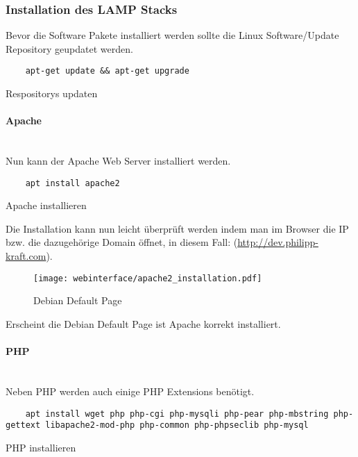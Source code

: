 \subsubsection{Installation des LAMP Stacks}
Bevor die Software Pakete installiert werden sollte die Linux Software/Update
Repository geupdatet werden.

\begin{listing}[H]
  \begin{verbatim}
    apt-get update && apt-get upgrade
  \end{verbatim}
  \caption{Respositorys updaten}
\end{listing}

\paragraph{Apache}\mbox{}\\

Nun kann der Apache Web Server installiert werden.

\begin{listing}[H]
  \begin{verbatim}
    apt install apache2
  \end{verbatim}
  \caption{Apache installieren}
\end{listing}

Die Installation kann nun leicht überprüft werden indem man im Browser die IP
bzw. die dazugehörige Domain öffnet, in diesem Fall:
(\url{http://dev.philipp-kraft.com}).

\begin{figure}[H]
  \centering
  \texttt{[image: webinterface/apache2\_installation.pdf]}
  \caption{Debian Default Page}
\end{figure}

Erscheint die Debian Default Page ist Apache korrekt installiert.

\paragraph{PHP}\mbox{}\\
Neben PHP werden auch einige PHP Extensions benötigt.

\begin{listing}[H]
  \begin{verbatim}
    apt install wget php php-cgi php-mysqli php-pear php-mbstring php-gettext libapache2-mod-php php-common php-phpseclib php-mysql
  \end{verbatim}
  \caption{PHP installieren}
\end{listing}

